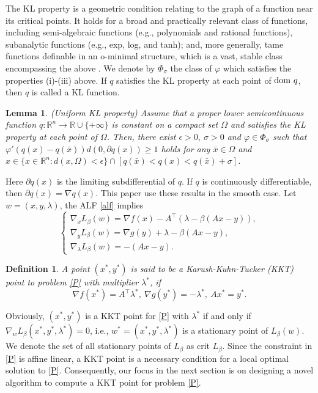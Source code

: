 \documentclass[pdflatex,sn-mathphys-num]{sn-jnl}%
\theoremstyle{thmstyleone}%
\newtheorem{lemma}{Lemma}
\theoremstyle{thmstyletwo}%
\theoremstyle{thmstylethree}%
\newtheorem{definition}{Definition}%
\begin{document}
The KL property is a geometric condition relating to the graph of a function near its critical points. It holds for a broad and practically relevant class of functions, including semi-algebraic functions (e.g., polynomials and rational functions), subanalytic functions (e.g., exp, log, and tanh); and, more generally, tame functions definable in an o-minimal structure, which is a vast, stable class encompassing the above \cite{attouch2009convergence,attouch2013convergence}. We denote by $\Phi_\sigma$ the class of $\varphi$ which satisfies the properties (i)-(iii) above. If $q$ satisfies the KL property at each point of ${\rm dom}~q$, then $q$ is called a KL function. 


\begin{lemma}\label{KLP}{\rm{\cite{BST14} (Uniform KL property)}} Assume that a proper lower semicontinuous function $q:\mathbb {R}^n\to \mathbb {R}\cup \{+\infty\}$ is constant on a compact set $\Omega$ and satisfies the KL property at each point of $\Omega$. Then, there exist $\epsilon>0,~\sigma>0$ and $\varphi\in\Phi_\sigma$ such that
$\varphi'(q(x)-q(\bar{x}))d(0,\partial q(x))\geq 1$ holds for any $ \bar{x}\in\Omega$  and $x\in\{x\in \mathbb {R}^n:d(x,\Omega)<\epsilon\}\cap[q(\bar{x})<q(x)<q(\bar{x})+\sigma]$.
\end{lemma}

Here $\partial q(x)$ is the limiting subdifferential of $q$. If $q$ is continuously differentiable, then $\partial q(x)=\nabla q(x)$. This paper use these results in the smooth case. Let $w=(x,y,\lambda)$, the ALF \eqref{alf} implies
\begin{equation}\label{F2}
\left\{\begin{array}{l}
\nabla _x L_{\beta}(w)=\nabla f(x)-A^{\top}(\lambda-\beta(A x-y)),\\
\nabla _y L_{\beta}(w)=\nabla g (y)+\lambda-\beta(A x-y),\\
\nabla _\lambda L_{\beta}(w)=-(Ax-y).
\end{array}\right.
\end{equation}
\begin{definition}{\rm A point $(x^*,y^*)$ is said to be a Karush-Kuhn-Tucker (KKT) point to problem \eqref{P} with multiplier $\lambda^*$, if
\[\nabla f(x^*)=A^\top \lambda^*,\ \nabla g(y^*)=-\lambda^*,\ Ax^*=y^*.\]
}\end{definition}
Obviously, $(x^*,y^*)$ is a KKT point for \eqref{P} with $\lambda^*$ if and only if $\nabla_w L_{\beta}(x^*,y^*,\lambda^*)=0$, i.e., $w^*=(x^*,y^*,\lambda^*)$ is a stationary point of $L_{\beta}(w)$. We denote the set of all stationary points of $L_{\beta}$ as crit $L_{\beta}$.
Since the constraint in \eqref{P} is affine linear, a KKT point is a necessary condition for a local optimal solution to \eqref{P}. Consequently, our focus in the next section is on designing a novel algorithm to compute a KKT point for problem \eqref{P}.
\end{document}
